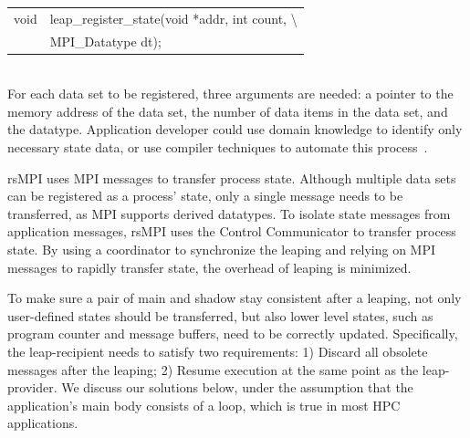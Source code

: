 \begin{tabular}{ l l}
void & leap\_register\_state(void *addr, int count, \textbackslash \\
& MPI\_Datatype dt);
\end{tabular} \\
For each data set to be registered, three arguments are needed: a pointer to the memory address of the data set, the number of data items in the data set, and the datatype. 
Application developer could use domain knowledge to identify only necessary state data, or use compiler techniques to automate this process~\cite{5160999}. 


rsMPI uses MPI messages to transfer process state. Although multiple data sets can be registered as a process' state, only a single message needs to be transferred, as MPI supports derived datatypes. To isolate state messages from application messages, rsMPI uses the Control Communicator to transfer process state.  
By using a coordinator to synchronize the leaping and relying on  MPI messages to rapidly transfer state, the overhead of leaping is minimized. 

To make sure a pair of main and shadow stay consistent after a leaping, not only user-defined states should be transferred, but also lower level states, such as program counter and message buffers, need to be correctly updated. Specifically, the leap-recipient needs to satisfy two requirements:  
1) Discard all obsolete messages after the leaping; 2) Resume execution at the same point as the leap-provider. We discuss our solutions below, under the assumption that the application's main body consists of a loop, which is true in most HPC applications. 

